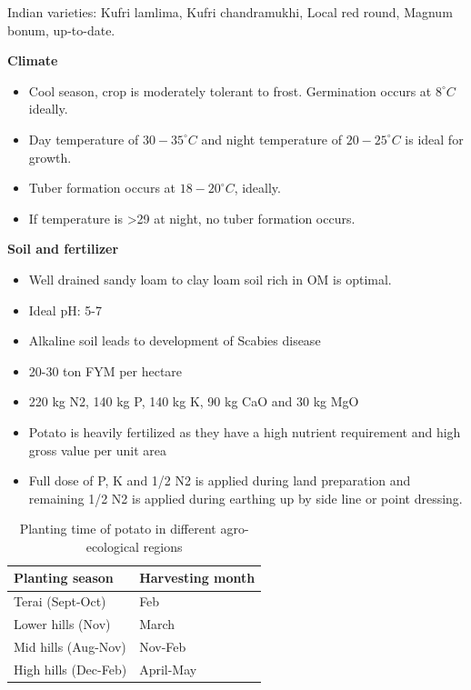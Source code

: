 \documentclass[
  openany]{book}
\providecommand{\tightlist}{%
  \setlength{\itemsep}{0pt}\setlength{\parskip}{0pt}}
\begin{document}
Indian varieties: Kufri lamlima, Kufri chandramukhi, Local red round, Magnum bonum, up-to-date.

\textbf{Climate}

\begin{itemize}
\tightlist
\item
  Cool season, crop is moderately tolerant to frost. Germination occurs at \(8^\circ C\) ideally.
\item
  Day temperature of \(30-35^\circ C\) and night temperature of \(20-25^\circ C\) is ideal for growth.
\item
  Tuber formation occurs at \(18-20^\circ C\), ideally.
\item
  If temperature is \textgreater29 at night, no tuber formation occurs.
\end{itemize}

\textbf{Soil and fertilizer}

\begin{itemize}
\tightlist
\item
  Well drained sandy loam to clay loam soil rich in OM is optimal.
\item
  Ideal pH: 5-7
\item
  Alkaline soil leads to development of Scabies disease
\item
  20-30 ton FYM per hectare
\item
  220 kg N2, 140 kg P, 140 kg K, 90 kg CaO and 30 kg MgO
\item
  Potato is heavily fertilized as they have a high nutrient requirement and high gross value per unit area
\item
  Full dose of P, K and 1/2 N2 is applied during land preparation and remaining 1/2 N2 is applied during earthing up by side line or point dressing.
\end{itemize}

\begin{table}

\caption{\label{tab:planting-time}Planting time of potato in different agro-ecological regions}
\centering
\begin{tabular}[t]{ll}
\toprule
Planting season & Harvesting month\\
\midrule
Terai (Sept-Oct) & Feb\\
Lower hills (Nov) & March\\
Mid hills (Aug-Nov) & Nov-Feb\\
High hills (Dec-Feb) & April-May\\
\bottomrule
\end{tabular}
\end{table}
\end{document}
